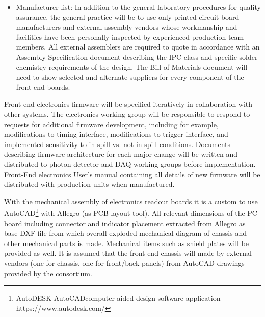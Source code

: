 \begin{itemize}
\item Manufacturer list: In addition to the general laboratory procedures for quality assurance, the general practice will be to use only printed circuit board manufacturers and external assembly vendors whose workmanship and facilities have been personally inspected by experienced production team members. All external assemblers are required to quote in accordance with an Assembly Specification document describing the IPC class and specific solder chemistry requirements of the design. The Bill of Materials document will need to show selected and alternate suppliers for every component of the front-end boards.

\end{itemize}

Front-end electronics firmware will be specified iteratively in collaboration with other systems. The electronics working group will be responsible to respond to requests for additional firmware development, including for example, modifications to timing interface, modifications to trigger interface, and implemented sensitivity to in-spill vs. not-in-spill conditions. Documents describing firmware architecture for each major change will be written and distributed to photon detector and DAQ working groups before implementation. Front-End electronics User's manual containing all details of new firmware will be distributed with production units when manufactured.

With the mechanical assembly of electronics readout boards it is a custom to use AutoCAD\footnote{AutoDESK AutoCAD\textregistered computer aided design software application https://www.autodesk.com/} with Allegro (as PCB layout tool). All relevant dimensions of the PC board including connector and indicator placement extracted from Allegro as base DXF file from which overall exploded mechanical diagram of chassis and other mechanical parts is made. Mechanical items such as shield plates will be provided as well. It is assumed that the front-end chassis will made by external vendors (one for chassis, one for front/back panels) from AutoCAD drawings provided by the consortium.

